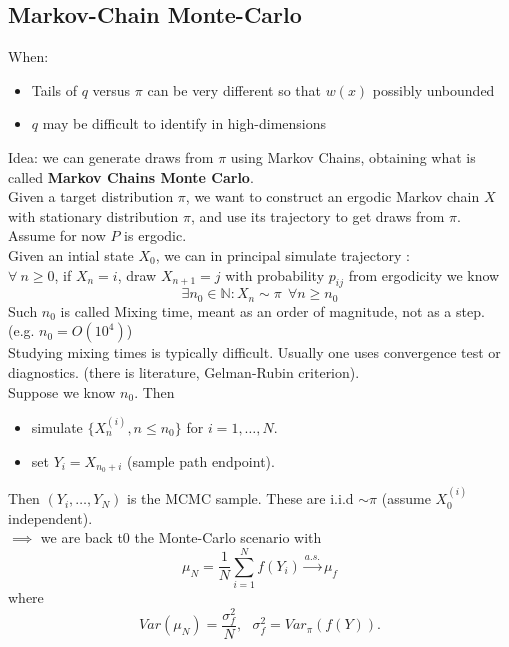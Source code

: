 \documentclass{article}
\begin{document}
	\subsection{Markov-Chain Monte-Carlo}
	When:
	\begin{itemize}
		\item Tails of $q$ versus $\pi$ can be very different so that $w(x)$ possibly unbounded
		\item $q$ may be difficult to identify in high-dimensions
	\end{itemize}
	Idea: we can generate draws from $\pi$ using Markov Chains, obtaining what is called \textbf{Markov Chains Monte Carlo}.\\
	Given a target distribution $\pi$, we want to construct an ergodic Markov chain $X$ with stationary distribution $\pi$, and use its trajectory to get draws from $\pi$. \\
	Assume for now $P$ is ergodic. \\ Given an intial state $X_0$, we can in principal simulate trajectory :\\
	$\forall \ n \geq 0 $, if $X_n = i$, draw $X_{n+1}=j$ with probability $p_{ij}$
	from ergodicity we know 
	\begin{equation*}
		\exists n_0 \in \mathbb{N}: X_n \sim \pi \ \ \forall n \geq n_0
	\end{equation*}
	Such $n_0$ is called Mixing time, meant as an order of magnitude, not as a step. (e.g. $n_0=O(10^4)$)\\
	Studying mixing times is typically difficult. Usually one uses convergence test or diagnostics.
	(there is literature, Gelman-Rubin criterion).\\
	Suppose we know $n_0$. Then 
	\begin{itemize}
		\item simulate $\{X_n ^{(i)}, n \leq n_0\}$ for $i=1, \dots, N$.
		\item set $Y_i = X_{n_0+i}$ (sample path endpoint).
	\end{itemize}
	Then $(Y_i, \dots, Y_N)$ is the MCMC sample. These are i.i.d $\sim \pi$ (assume $X_0^{(i)}$ independent).\\
	$\implies$ we are back t0 the Monte-Carlo scenario with 
	\begin{equation*}
		\mu_N = \frac{1}{N}\sum_{i=1}^N f(Y_i) \xrightarrow{a.s.} \mu_f
	\end{equation*}
	where 
	\begin{equation*}
		Var(\mu_N)= \frac{\sigma_f^2}{N}, \  \  \ \sigma_f^2= Var_{\pi}(f(Y)). 
	\end{equation*}
\end{document}
